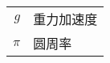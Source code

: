 
\begin{nomenclature*}
\label{chap:symb}

\begin{longtable}{rl}
  $g$  & 重力加速度  \\  
  $\pi$ & 圆周率
\end{longtable}

\end{nomenclature*}

